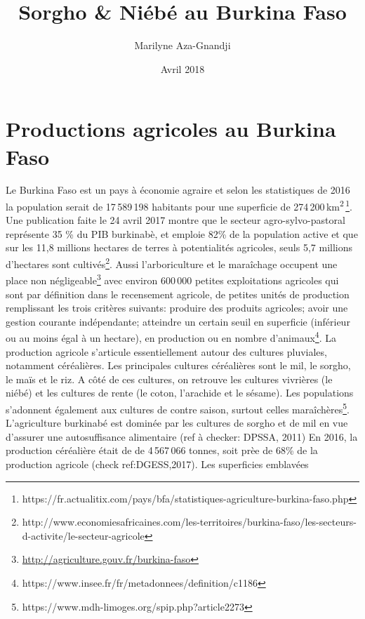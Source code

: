 \documentclass[a4paper,11pt]{article}
\begin{document}
\title{Sorgho \& Niébé au Burkina Faso}
\author{Marilyne Aza-Gnandji}
\date{Avril 2018} 

\maketitle
\tableofcontents

\section{Productions agricoles au Burkina Faso}

Le Burkina Faso est un pays à économie agraire\cite{Koulibi_FideleZONGO}
et selon les statistiques de 2016 la population serait de 17\,589\,198 habitants
pour une superficie de 274\,200\,km\textsuperscript{2}\,\footnote{https://fr.actualitix.com/pays/bfa/statistiques-agriculture-burkina-faso.php}. Une publication faite le 24 avril 2017 montre que le  secteur agro-sylvo-pastoral représente 35 \% du PIB burkinabè, et emploie 82\% de la population active et que sur les 11,8 millions hectares de terres à potentialités agricoles, seuls 5,7 millions d’hectares sont cultivés\footnote{http://www.economiesafricaines.com/les-territoires/burkina-faso/les-secteurs-d-activite/le-secteur-agricole}. Aussi l'arboriculture et le maraîchage occupent une place
non négligeable\footnote{\url{http://agriculture.gouv.fr/burkina-faso}}
avec environ 600\,000 petites exploitations agricoles qui sont par
définition dans le recensement agricole, de petites unités de
production remplissant les trois critères suivants: produire des
produits agricoles; avoir une gestion courante indépendante; atteindre
un certain seuil en superficie (inférieur ou au moins égal à un
hectare), en production ou en nombre d’animaux\footnote{https://www.insee.fr/fr/metadonnees/definition/c1186}. La production agricole s’articule essentiellement autour des cultures pluviales, notamment céréalières. Les principales cultures céréalières sont le mil, le sorgho, le maïs et le riz. A côté de ces cultures, on retrouve les cultures vivrières (le niébé) et les cultures de rente (le coton, l’arachide et le sésame). Les populations s’adonnent également aux cultures de contre saison, surtout celles maraîchères\footnote{https://www.mdh-limoges.org/spip.php?article2273}.
L'agriculture burkinabé est dominée par les cultures de sorgho et de
mil en vue d'assurer une autosuffisance alimentaire (ref à checker: DPSSA, 2011)
En 2016, la production céréalière était de de 4\,567\,066 tonnes, soit prèe
de 68\% de la production agricole (check ref:DGESS,2017). Les superficies emblavées
\end{document}
